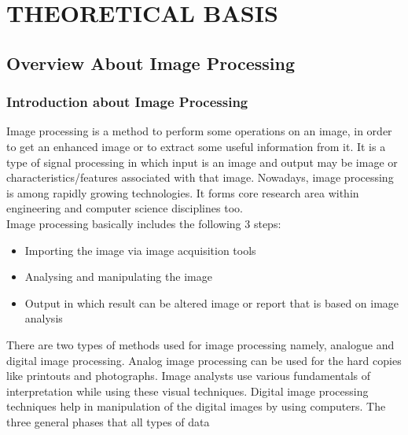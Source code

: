 \chapter{THEORETICAL BASIS}

\renewcommand{\headrulewidth}{0.5pt}
\renewcommand{\footrulewidth}{0.5pt}
\thispagestyle{plain}
\pagestyle{fancy}
\fancyhf{}
\raggedright
{}

\justifying

\section{Overview About Image Processing}
    \subsection{Introduction about Image Processing}
        Image processing is a method to perform some operations on an image, 
        in order to get an enhanced image or to extract some useful information from it. It is a type of signal 
        processing in which input is an image and output may be image or characteristics/features associated with 
        that image. Nowadays, image processing is among rapidly growing technologies. It forms core research area 
        within engineering and computer science disciplines too. \\ 
        \vspace{3mm}
        Image processing basically includes the following 3 steps:
        \begin{itemize}
            \item Importing the image via image acquisition tools
            \item Analysing and manipulating the image
            \item Output in which result can be altered image or report that is based on image analysis
        \end{itemize}
        There are two types of methods used for image processing namely, analogue and digital image processing. 
        Analog image processing can be used for the hard copies like printouts and photographs. Image analysts use 
        various fundamentals of interpretation while using these visual techniques. Digital image processing techniques 
        help in manipulation of the digital images by using computers. The three general phases that all types of data 

